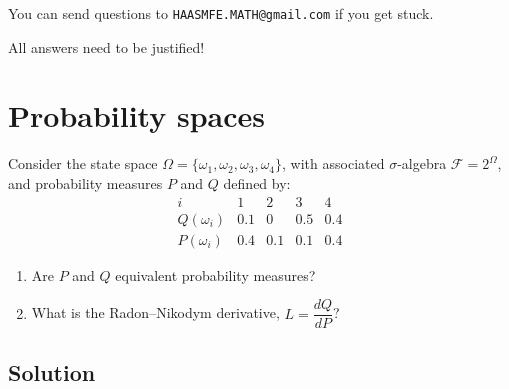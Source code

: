 \documentclass{article}
\begin{document}
\noindent You can send questions to \texttt{HAASMFE.MATH@gmail.com} if you get stuck.

\vspace{1em}

\noindent All answers need to be justified!

\newpage

\section{Probability spaces}

Consider the state space $\Omega=\{\omega_1,\omega_2,\omega_3,\omega_4\}$, with associated $\sigma$-algebra $\mathcal{F}=2^\Omega$, and probability measures $P$ and $Q$ defined by:
\[
\begin{array}{c|cccc}
i & 1 & 2 & 3 & 4\\ \hline
Q(\omega_i) & 0.1 & 0 & 0.5 & 0.4\\
P(\omega_i) & 0.4 & 0.1 & 0.1 & 0.4
\end{array}
\]

\begin{enumerate}
\item[(a)] Are $P$ and $Q$ equivalent probability measures?
\item[(b)] What is the Radon--Nikodym derivative, $L=\dfrac{dQ}{dP}$?
\end{enumerate}

\subsection*{Solution}
\end{document}
